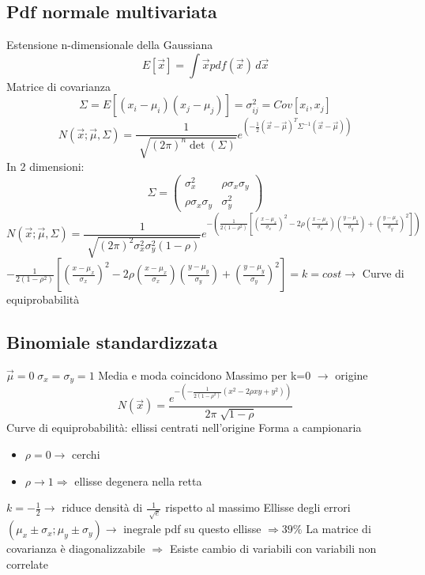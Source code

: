 \documentclass[12pt]{report}
\theoremstyle{remark}
\theoremstyle{theorem}
\begin{document}
\subsection{Pdf normale multivariata}
Estensione n-dimensionale della Gaussiana
\[E[\vec{x}]=\int \vec{x}pdf(\vec{x})\,d\vec{x}\]
Matrice di covarianza	
\[\Sigma = E[(x_i-\mu_i)(x_j-\mu_j)] = \sigma^2_{ij} = Cov[x_i,x_j]\]
\[N(\vec{x};\vec{\mu},\Sigma) = \frac{1}{\sqrt[]{{(2\pi)}^n\det (\Sigma)}}e^{(-\frac{1}{2}{(\vec{x}-\vec{\mu})}^T \Sigma^{-1}(\vec{x}-\vec{\mu}))}\]
In 2 dimensioni:
\[\Sigma = \left(\begin{array}{cc}
	\sigma^2_x & \rho\sigma_x\sigma_y \\
	\rho\sigma_x\sigma_y & \sigma^2_y
\end{array}\right)\]
\[N(\vec{x};\vec{\mu},\Sigma) = \frac{1}{\sqrt[]{{(2\pi)}^2\sigma^2_x\sigma^2_y(1-\rho)}}e^{-\left(\frac{1}{2(1-\rho^2)}\left[{\left(\frac{x-\mu_x}{\sigma_x}\right)}^2-2\rho\left(\frac{x-\mu_x}{\sigma_x}\right)\left(\frac{y-\mu_y}{\sigma_y}\right)+{\left(\frac{y-\mu_y}{\sigma_y}\right)}^2\right]\right)}\]
$-\frac{1}{2(1-\rho^2)}\left[{\left(\frac{x-\mu_x}{\sigma_x}\right)}^2-2\rho\left(\frac{x-\mu_x}{\sigma_x}\right)\left(\frac{y-\mu_y}{\sigma_y}\right)+{\left(\frac{y-\mu_y}{\sigma_y}\right)}^2\right]
=k=cost \to$ Curve di equiprobabilità

\subsection{Binomiale standardizzata}
$\vec{\mu}=0 \; \sigma_x=\sigma_y=1$ \newline
Media e moda coincidono \newline
Massimo per k=0 $\to$ origine
\[N(\vec{x}) = \frac{e^{-\left(-\frac{1}{2(1-\rho^2)}(x^2-2\rho xy +y^2)\right)}}{2\pi \sqrt[]{1-\rho}}\]
Curve di equiprobabilità: ellissi centrati nell'origine \newline
Forma a campionaria
\begin{itemize}
	\item $\rho=0 \to$ cerchi
 \item $\rho\to 1 \Rightarrow$ ellisse degenera nella retta 
\end{itemize}
$k = -\frac{1}{2} \to$ riduce densità di $\frac{1}{\sqrt[]{e}}$ rispetto al massimo \newline
Ellisse degli errori $(\mu_x \pm \sigma_x; \mu_y \pm \sigma_y) \to $ inegrale pdf su questo ellisse $\Rightarrow 39\%$ \newline
La matrice di covarianza è diagonalizzabile $\Rightarrow$ Esiste cambio di variabili con variabili non correlate
\end{document}
